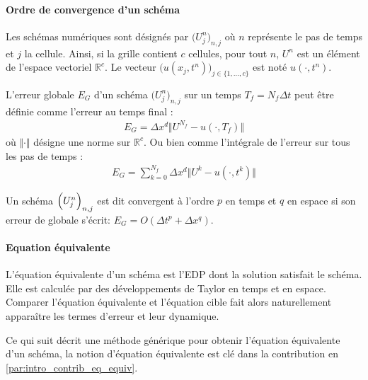         \paragraph{Ordre de convergence d'un schéma}
        Les schémas numériques sont désignés par $\bigl(U^n_j\bigr)_{n,j}$ où $n$ représente le pas de temps 
        et $j$ la cellule. Ainsi, si la grille contient $c$ cellules, 
        pour tout $n$, $U^n$ est un élément de l'espace vectoriel $\mathbb{R}^c$.
        Le vecteur $\bigl(u(x_j,t^n)\bigr)_{j \in \{1,\ldots,c\}}$ est noté $u(\cdot,t^n)$.

        \begin{definition}
        L'erreur globale $E_G$ d'un schéma $\bigl(U^n_j\bigr)_{n,j}$ sur un temps $T_f = N_f \Delta t$ peut être définie comme l'erreur au temps final :
        \begin{align}
        E_G = \Delta x^d \Vert U^{N_f} - u(\cdot , T_f) \Vert
        \end{align}
        où $\Vert \cdot \Vert$ désigne une norme sur $\mathbb{R}^c$.
        Ou bien comme l'intégrale de l'erreur sur tous les pas de temps :
        \begin{align}
        E_G = \sum_{k=0}^{N_f}\Delta x^d \Vert U^{k} - u(\cdot , t^k) \Vert
        \end{align}
        \end{definition}
        \begin{definition}
            Un schéma $\Bigl(U^n_j\Bigr)_{n,j}$ est dit convergent à l'ordre $p$ en temps et $q$ en espace si 
            son erreur de globale s'écrit: $E_G = O(\Delta t^{p} + \Delta x^{q})$.
        \end{definition}
        \paragraph{Equation équivalente}\label{par:eq_equiv}
        \begin{definition}
        L'équation équivalente d'un schéma est l'EDP dont la solution satisfait le schéma.
        Elle est calculée par des développements de Taylor en temps et en espace.
        Comparer l'équation équivalente et l'équation cible fait alors naturellement apparaître les termes d'erreur et leur dynamique.
        \end{definition}

        Ce qui suit décrit une méthode générique pour obtenir l'équation équivalente d'un schéma, la notion d'équation équivalente est clé dans la contribution en \ref{par:intro_contrib_eq_equiv}.

